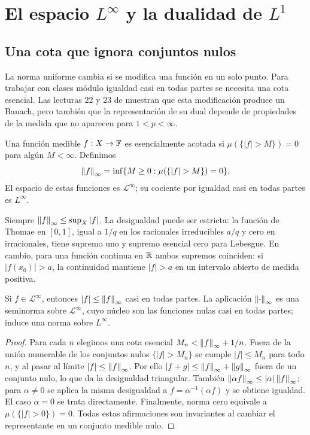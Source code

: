 \chapter{El espacio \texorpdfstring{$L^\infty$}{L infinito} y la dualidad de \texorpdfstring{$L^1$}{L1}}\label{v2:cap11}\label{cap:v2-11}
\section{Una cota que ignora conjuntos nulos}\label{lectura:v2-22}
La norma uniforme cambia si se modifica una función en un solo punto. Para trabajar con clases módulo igualdad casi en todas partes se necesita una cota esencial. Las lecturas 22 y 23 de \cite{valencia2} muestran que esta modificación produce un Banach, pero también que la representación de su dual depende de propiedades de la medida que no aparecen para $1<p<\infty$.
\begin{definicion}
Una función medible $f:X\to\mathbb F$ es esencialmente acotada si $\mu(\{|f|>M\})=0$ para algún $M<\infty$. Definimos
\[
 \norm f_\infty=\inf\{M\ge0:\mu(\{|f|>M\})=0\}.
\]
El espacio de estas funciones es $\mathcal L^\infty$; su cociente por igualdad casi en todas partes es $L^\infty$.
\end{definicion}
Siempre $\left\lVert f\right\rVert_\infty\le\sup_X|f|$. La desigualdad puede ser estricta: la función de Thomae en $[0,1]$, igual a $1/q$ en los racionales irreducibles $a/q$ y cero en irracionales, tiene supremo uno y supremo esencial cero para Lebesgue. En cambio, para una función continua en $\mathbb R$ ambos supremos coinciden: si $|f(x_0)|>a$, la continuidad mantiene $|f|>a$ en un intervalo abierto de medida positiva.
\begin{proposicion}\label{v2:linfty-cota}
Si $f\in\mathcal L^\infty$, entonces $|f|\le\left\lVert f\right\rVert_\infty$ casi en todas partes. La aplicación $\left\lVert\cdot\right\rVert_\infty$ es una seminorma sobre $\mathcal L^\infty$, cuyo núcleo son las funciones nulas casi en todas partes; induce una norma sobre $L^\infty$.
\end{proposicion}
\begin{proof}
Para cada $n$ elegimos una cota esencial $M_n<\left\lVert f\right\rVert_\infty+1/n$. Fuera de la unión numerable de los conjuntos nulos $\{|f|>M_n\}$ se cumple $|f|\le M_n$ para todo $n$, y al pasar al límite $|f|\le\left\lVert f\right\rVert_\infty$. Por ello $|f+g|\le\left\lVert f\right\rVert_\infty+\left\lVert g\right\rVert_\infty$ fuera de un conjunto nulo, lo que da la desigualdad triangular. También $\left\lVert\alpha f\right\rVert_\infty\le|\alpha|\left\lVert f\right\rVert_\infty$; para $\alpha\ne0$ se aplica la misma desigualdad a $f=\alpha^{-1}(\alpha f)$ y se obtiene igualdad. El caso $\alpha=0$ se trata directamente. Finalmente, norma cero equivale a $\mu(\{|f|>0\})=0$. Todas estas afirmaciones son invariantes al cambiar el representante en un conjunto medible nulo.
\end{proof}
